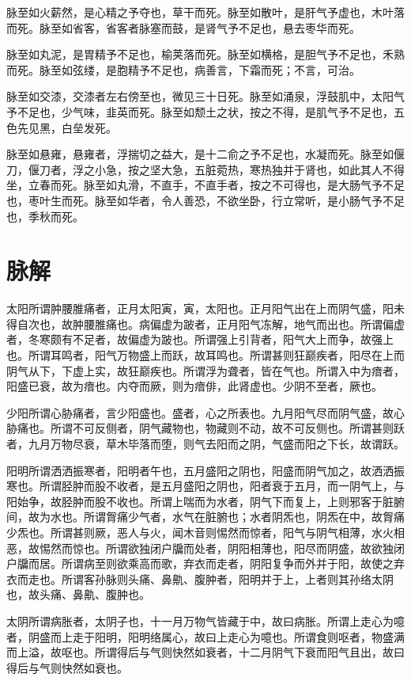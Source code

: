 \documentclass{article}%
\begin{document}
脉至如火薪然，是心精之予夺也，草干而死。脉至如散叶，是肝气予虚也，木叶落而死。脉至如省客，省客者脉塞而鼓，是肾气予不足也，悬去枣华而死。

脉至如丸泥，是胃精予不足也，榆荚落而死。脉至如横格，是胆气予不足也，禾熟而死。脉至如弦缕，是胞精予不足也，病善言，下霜而死；不言，可治。

脉至如交漆，交漆者左右傍至也，微见三十日死。脉至如涌泉，浮鼓肌中，太阳气予不足也，少气味，韭英而死。脉至如颓土之状，按之不得，是肌气予不足也，五色先见黑，白垒发死。

脉至如悬雍，悬雍者，浮揣切之益大，是十二俞之予不足也，水凝而死。脉至如偃刀，偃刀者，浮之小急，按之坚大急，五脏菀热，寒热独并于肾也，如此其人不得坐，立春而死。脉至如丸滑，不直手，不直手者，按之不可得也，是大肠气予不足也，枣叶生而死。脉至如华者，令人善恐，不欲坐卧，行立常听，是小肠气予不足也，季秋而死。
\section{脉解}
太阳所谓肿腰脽痛者，正月太阳寅，寅，太阳也。正月阳气出在上而阴气盛，阳未得自次也，故肿腰脽痛也。病偏虚为跛者，正月阳气冻解，地气而出也。所谓偏虚者，冬寒颇有不足者，故偏虚为跛也。所谓强上引背者，阳气大上而争，故强上也。所谓耳鸣者，阳气万物盛上而跃，故耳鸣也。所谓甚则狂巅疾者，阳尽在上而阴气从下，下虚上实，故狂巅疾也。所谓浮为聋者，皆在气也。所谓入中为瘖者，阳盛已衰，故为瘖也。内夺而厥，则为瘖俳，此肾虚也。少阴不至者，厥也。

少阳所谓心胁痛者，言少阳盛也。盛者，心之所表也。九月阳气尽而阴气盛，故心胁痛也。所谓不可反侧者，阴气藏物也，物藏则不动，故不可反侧也。所谓甚则跃者，九月万物尽衰，草木毕落而堕，则气去阳而之阴，气盛而阳之下长，故谓跃。

阳明所谓洒洒振寒者，阳明者午也，五月盛阳之阴也，阳盛而阴气加之，故洒洒振寒也。所谓胫肿而股不收者，是五月盛阳之阴也，阳者衰于五月，而一阴气上，与阳始争，故胫肿而股不收也。所谓上喘而为水者，阴气下而复上，上则邪客于脏腑间，故为水也。所谓胷痛少气者，水气在脏腑也；水者阴炁也，阴炁在中，故胷痛少炁也。所谓甚则厥，恶人与火，闻木音则惕然而惊者，阳气与阴气相薄，水火相恶，故惕然而惊也。所谓欲独闭户牖而处者，阴阳相薄也，阳尽而阴盛，故欲独闭户牖而居。所谓病至则欲乘高而歌，弃衣而走者，阴阳复争而外并于阳，故使之弃衣而走也。所谓客孙脉则头痛、鼻鼽、腹肿者，阳明并于上，上者则其孙络太阴也，故头痛、鼻鼽、腹肿也。

太阴所谓病胀者，太阴子也，十一月万物气皆藏于中，故曰病胀。所谓上走心为噫者，阴盛而上走于阳明，阳明络属心，故曰上走心为噫也。所谓食则呕者，物盛满而上溢，故呕也。所谓得后与气则快然如衰者，十二月阴气下衰而阳气且出，故曰得后与气则快然如衰也。
\end{document}
